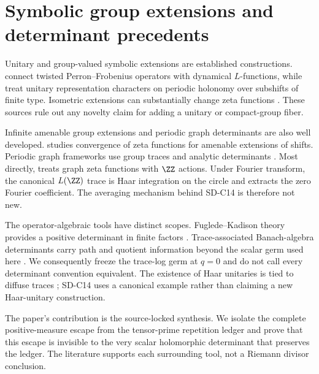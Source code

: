 \section{Symbolic group extensions and determinant precedents}
\label{sec:related}

Unitary and group-valued symbolic extensions are established constructions.
\citet{adachisunada1987} connect twisted Perron--Frobenius operators with
dynamical $L$-functions, while \citet[Chapter~8]{parrypollicott1990} treat
unitary representation characters on periodic holonomy over subshifts of
finite type.  Isometric extensions can substantially change zeta functions
\citep{ward1999}.  These sources rule out any novelty claim for adding a
unitary or compact-group fiber.

Infinite amenable group extensions and periodic graph determinants are also
well developed.  \citet{sharp2020} studies convergence of zeta functions for
amenable extensions of shifts.  Periodic graph frameworks use group traces
and analytic determinants \citep{guidoisolalapidus2008}.  Most directly,
\citet{clair2009} treats graph zeta functions with $\ZZ$ actions.  Under
Fourier transform, the canonical $L(\ZZ)$ trace is Haar integration on the
circle and extracts the zero Fourier coefficient.  The averaging mechanism
behind SD-C14 is therefore not new.

The operator-algebraic tools have distinct scopes.  Fuglede--Kadison theory
provides a positive determinant in finite factors
\citep{fugledekadison1952}.  Trace-associated Banach-algebra determinants
carry path and quotient information beyond the scalar germ used here
\citep{delaharpeskandalis1984}.  We consequently freeze the trace-log germ at
$q=0$ and do not call every determinant convention equivalent.  The existence
of Haar unitaries is tied to diffuse traces \citep{thiel2024}; SD-C14 uses a
canonical example rather than claiming a new Haar-unitary construction.

The paper's contribution is the source-locked synthesis.  We isolate the
complete positive-measure escape from the tensor-prime repetition ledger and
prove that this escape is invisible to the very scalar holomorphic determinant
that preserves the ledger.  The literature supports each surrounding tool,
not a Riemann divisor conclusion.
